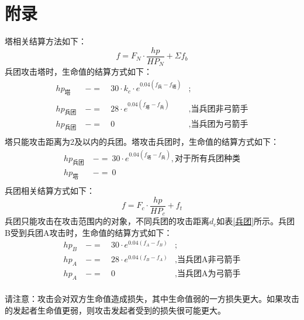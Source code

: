 \documentclass[a4paper,4pt]{article}
\begin{document}
\section{附录}
塔相关结算方法如下：
\begin{equation}
  f = F_N \cdot \frac{hp}{HP_N} + \Sigma f_b\label{f}
\end{equation}
兵团攻击塔时，生命值的结算方式如下：
\begin{equation}
  \begin{aligned}
    hp_{\text{塔}}   & \ -= & \ 30 \cdot k_c \cdot e^{0.04(f_{\text{兵}}-f_{\text{塔}})} & ;                       \\
    hp_{\text{兵团}} & \ -= & \ 28 \cdot e^{0.04(f_{\text{塔}}-f_{\text{兵}})}           & , \text{当兵团非弓箭手} \\
    hp_{\text{兵团}} & \ -= & \ 0                                                        & , \text{当兵团为弓箭手} \\
  \end{aligned}
  \label{hp1}
\end{equation}
塔只能攻击距离为2及以内的兵团。塔攻击兵团时，生命值的结算方式如下：
\begin{equation}
  \begin{aligned}
    hp_{\text{兵团}} & \ -=\ 30 \cdot e^{0.04(f_{\text{塔}}-f_{\text{兵}})}, \text{对于所有兵团种类} \\
    hp_{\text{塔}}   & \ -=\ 0                                                                       \\
  \end{aligned}
  \label{hp2}
\end{equation}
兵团相关结算方式如下：
\begin{equation}
  f = F_c \cdot \frac{hp}{HP_c} + f_t\label{f2}
\end{equation}
兵团只能攻击在攻击范围内的对象，不同兵团的攻击距离$d_c$如表\ref{兵团}所示。兵团B受到兵团A攻击时，生命值的结算方式如下：
\begin{equation}
  \begin{aligned}
    hp_{B} & \ -= & \ 30 \cdot e^{0.04(f_{A}-f_{B})} & ;                        \\
    hp_{A} & \ -= & \ 28 \cdot e^{0.04(f_{B}-f_{A})} & , \text{当兵团A非弓箭手} \\
    hp_{A} & \ -= & \ 0                              & , \text{当兵团A为弓箭手} \\
  \end{aligned}
  \label{hp2}
\end{equation}\par
请注意：攻击会对双方生命值造成损失，其中生命值弱的一方损失更大。如果攻击的发起者生命值更弱，则攻击发起者受到的损失很可能更大。
\end{document}
